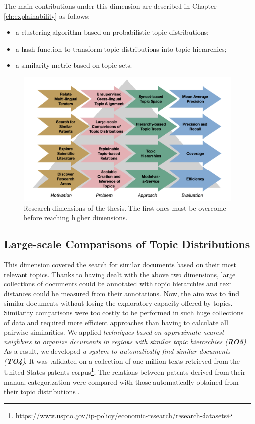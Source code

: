 The main contributions under this dimension are described in Chapter \ref{ch:explainability} as follows:
\begin{itemize}
\item a clustering algorithm based on probabilistic topic distributions;
\item a hash function to transform topic distributions into topic hierarchies;
\item a similarity metric based on topic sets.
\end{itemize} 

\begin{figure}[!htbp]
\centering
\includegraphics[scale=0.24]{dimensions.png}
\caption{Research dimensions of the thesis. The first ones must be overcome before reaching higher dimensions. }
\label{fig:dimensions}
\end{figure}

\subsection{Large-scale Comparisons of Topic Distributions}

This dimension covered the search for similar documents based on their most relevant topics. Thanks to having dealt with the above two dimensions, large collections of documents could be annotated with topic hierarchies and text distances could be measured from their annotations. Now, the aim was to find similar documents without losing the exploratory capacity offered by topics. Similarity comparisons were too costly to be performed in such huge collections of data and required more efficient approaches than having to calculate all pairwise similarities. We applied \textit{techniques based on approximate nearest-neighbors to organize documents in regions with similar topic hierarchies (\textbf{RO5})}. As a result, we developed \textit{a system to automatically find similar documents (\textbf{TO4})}. It was validated on a collection of one million texts retrieved from the United States patents corpus\footnote{\url{https://www.uspto.gov/ip-policy/economic-research/research-datasets}}. The relations between patents derived from their manual categorization were compared with those automatically obtained from their topic distributions \citep{Badenes-Olmedo2020, Badenes-Olmedo2019b}. 

